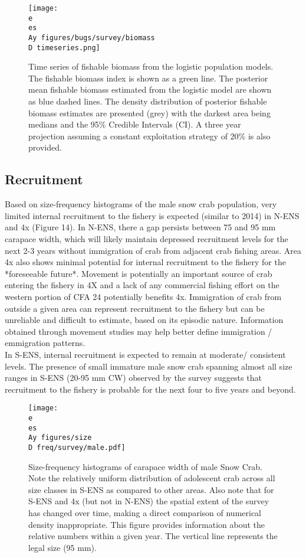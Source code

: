 \documentclass[paper=a4, fontsize=11pt]{article}
\newcommand{\D}{.}
\newcommand{\e}{/home/michelle/ecomod_data/}
\newcommand{\es}{snowcrab/}
\newcommand{\Ay}{assessments/2015/}
\begin{document}
\begin{figure}[ht]
    \centering
    \texttt{[image: \\e \\es \\Ay figures/bugs/survey/biomass\\D timeseries.png]}
    \caption{Time series of fishable biomass from the logistic population models. The fishable biomass index is shown as a green line. The posterior mean fishable biomass estimated from the logistic model are shown as blue dashed lines. The density distribution of posterior fishable biomass estimates are presented (grey) with the darkest area being medians and the 95\% Credible Intervals (CI). A three year projection assuming a constant exploitation strategy of 20\% is also provided.}
\end{figure}
\clearpage


\subsection{Recruitment}
 Based on size-frequency histograms of the male snow crab population, very limited internal recruitment to the fishery is expected (similar to 2014) in N-ENS and 4x (Figure 14). In N-ENS, there a gap persists between 75 and 95 mm carapace width, which will likely maintain depressed recruitment levels for the next 2-3 years without immigration of crab from adjacent crab fishing areas. Area 4x also shows minimal potential for internal recruitment to the fishery for the *foreseeable future*. Movement is potentially an important source of crab entering the fishery in 4X and a lack of any commercial fishing effort on the western portion of CFA 24 potentially benefits 4x. Immigration of crab from outside a given area can represent recruitment to the fishery but can be unreliable and difficult to estimate,  based on its episodic nature. Information obtained through movement studies may help better define immigration / emmigration patterns. \\

In S-ENS, internal recruitment is expected to remain at moderate/ consistent levels. The presence of small immature male snow crab spanning almost all size ranges in S-ENS (20-95 mm CW) observed by the survey suggests that recruitment to the fishery is probable for the next four to five years and beyond. 

\begin{figure}[h]
    \centering
    \texttt{[image: \\e \\es \\Ay figures/size\\D freq/survey/male.pdf]}
    \caption{Size-frequency histograms of carapace width of male Snow Crab. Note the relatively uniform distribution of adolescent crab across all size classes in S-ENS as compared to other areas. Also note that for S-ENS and 4x (but not in N-ENS) the spatial extent of the survey has changed over time, making a direct comparison of numerical density inappropriate. This figure provides information about the relative numbers within a given year. The vertical line represents the legal size (95 mm).}
\end{figure}
\clearpage
\end{document}
